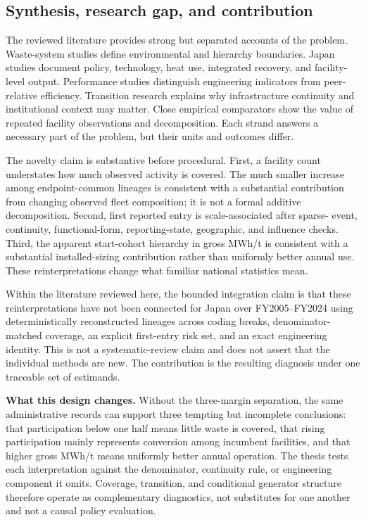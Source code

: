 \documentclass[12pt,letterpaper]{article}
\begin{document}
\subsection{Synthesis, research gap, and contribution}

The reviewed literature provides strong but separated accounts of the problem.
Waste-system studies define environmental and hierarchy boundaries. Japan
studies document policy, technology, heat use, integrated recovery, and
facility-level output. Performance studies distinguish engineering indicators
from peer-relative efficiency. Transition research explains why infrastructure
continuity and institutional context may matter. Close empirical comparators
show the value of repeated facility observations and decomposition. Each strand
answers a necessary part of the problem, but their units and outcomes differ.

The novelty claim is substantive before procedural. First, a facility count
understates how much observed activity is covered. The much smaller increase
among endpoint-common lineages is consistent with a substantial contribution
from changing observed fleet composition; it is not a formal additive
decomposition. Second, first reported entry is scale-associated after sparse-
event, continuity, functional-form, reporting-state, geographic, and influence
checks. Third, the apparent start-cohort hierarchy in gross MWh/t is consistent
with a substantial installed-sizing contribution rather than uniformly better
annual use. These reinterpretations change what familiar national statistics
mean.

Within the literature reviewed here, the bounded integration claim is that
these reinterpretations have not been connected for Japan over FY2005--FY2024
using deterministically reconstructed lineages across coding breaks, denominator-matched coverage, an
explicit first-entry risk set, and an exact engineering identity. This is not a
systematic-review claim and does not assert that the individual methods are new.
The contribution is the resulting diagnosis under one traceable set of
estimands.

\noindent\textbf{What this design changes.} Without the three-margin separation,
the same administrative records can support three tempting but incomplete
conclusions: that participation below one half means little waste is covered,
that rising participation mainly represents conversion among incumbent
facilities, and that higher gross MWh/t means uniformly better annual
operation. The thesis tests each interpretation against the denominator,
continuity rule, or engineering component it omits. Coverage, transition, and
conditional generator structure therefore operate as complementary
diagnostics, not substitutes for one another and not a causal policy evaluation.
\end{document}
